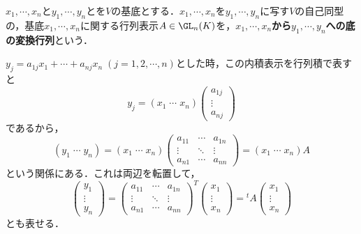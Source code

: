 \documentclass[uplatex, dvipdfmx]{jsreport}
\begin{document}
\begin{definition}
    $x_1,\cdots,x_n$と$y_1,\cdots,y_n$とを$V$の基底とする．$x_1,\cdots,x_n$を$y_1,\cdots,y_n$に写す$V$の自己同型の，基底$x_1,\cdots,x_n$に関する行列表示$A\in \GL_n(K)$を，\textbf{$x_1,\cdots,x_n$から$y_1,\cdots,y_n$への底の変換行列}という．
\end{definition}
\begin{remarks}
    $y_{j}=a_{1j}x_1+\cdots+a_{nj}x_n\;(j=1,2,\cdots,n)$とした時，この内積表示を行列積で表すと
    \[y_j=(x_1\;\cdots\;x_n)\begin{pmatrix}a_{1j}\\\vdots\\a_{nj}\end{pmatrix}\]
    であるから，
    \[ (y_1\;\cdots\;y_n) = (x_1\;\cdots\;x_n)\begin{pmatrix}a_{11}&\cdots&a_{1n}\\\vdots&\ddots&\vdots\\a_{n1}&\cdots&a_{nn}\end{pmatrix}=(x_1\;\cdots\;x_n)A \]
    という関係にある．これは両辺を転置して，
    \[ \begin{pmatrix}y_1\\\vdots\\y_n\end{pmatrix} = \begin{pmatrix}a_{11}&\cdots&a_{1n}\\\vdots&\ddots&\vdots\\a_{n1}&\cdots&a_{nn}\end{pmatrix}^T\begin{pmatrix}x_1\\\vdots\\x_n\end{pmatrix}={}^t\!A\begin{pmatrix}x_1\\\vdots\\x_n\end{pmatrix} \]
    とも表せる．
\end{remarks}
\end{document}

